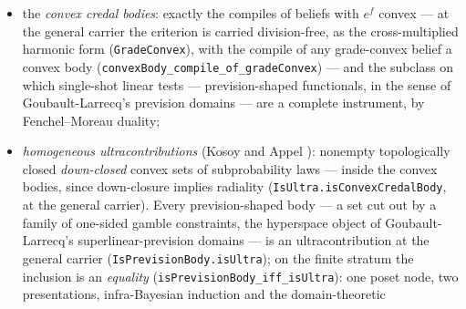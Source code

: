 \begin{remark}
\begin{itemize}
  record space the belief $\log(2 - \mu\{a\})$ is strictly concave
  along the simplex while its exponential is affine, a
  kernel-checked witness with its exact rational comparison
  (\texttt{QtslAux.Imprecise.PenaltyCredalIso}). And the lsc half is
  not implied by the convex half: a bounded, two-valued convex
  belief's body can fail to be topologically closed, the failure
  a jump at the simplex boundary --- a convex function is
  automatically continuous on the relative interior, so
  boundary-lsc is exactly what convexity leaves unsecured
  (\texttt{exists\_penaltyConvex\_not\_closed}), and the same
  witness compiles to a body that no convex lsc belief compiles,
  so the two-property class is strictly smaller than the
  convexity-only reading would have been
  (\texttt{exists\_penaltyConvex\_compile\_not\_richardson}). The
  lsc half is thereby the half that makes the class a subclass of
  the credal bodies at all; the convex half is what places it under
  the convex bodies. The
  placement is a general-carrier theorem, exponential-free: additive
  convexity of the belief implies the exact grade-convexity
  criterion by weighted arithmetic--geometric means
  (\texttt{IsRichardsonBody.isConvexCredalBody});
\item the \emph{convex credal bodies}: exactly the compiles of
  beliefs with $e^{f}$ convex --- at the general carrier the
  criterion is carried division-free, as the cross-multiplied
  harmonic form (\texttt{GradeConvex}), with the compile of any
  grade-convex belief a convex body
  (\texttt{convexBody\_compile\_of\_gradeConvex}) --- and the
  subclass on which
  single-shot linear tests --- prevision-shaped functionals, in the
  sense of Goubault-Larrecq's prevision domains
  \cite{goubaultlarrecq07, goubaultlarrecq08} --- are a complete
  instrument, by Fenchel--Moreau duality;
\item \emph{homogeneous ultracontributions} (Kosoy and Appel
  \cite{kosoy20}): nonempty topologically closed \emph{down-closed}
  convex sets of subprobability laws --- inside the convex bodies,
  since down-closure implies radiality
  (\texttt{IsUltra.isConvexCredalBody}, at the general carrier).
  Every prevision-shaped body --- a set cut out by a family of
  one-sided gamble constraints, the hyperspace object of
  Goubault-Larrecq's superlinear-prevision domains --- is an
  ultracontribution at the general carrier
  (\texttt{IsPrevisionBody.isUltra}); on the finite stratum the
  inclusion is an \emph{equality}
  (\texttt{isPrevisionBody\_iff\_isUltra}): one poset node, two
  presentations, infra-Bayesian induction and the domain-theoretic

\end{itemize}
\end{remark}
